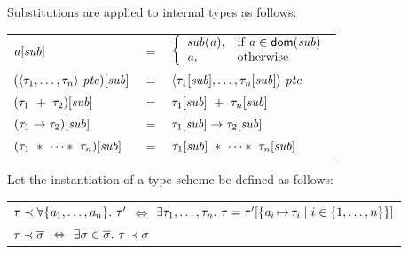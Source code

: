 \documentclass[final]{article}
\begin{document}
Substitutions are applied to internal types as follows:
\begin{center}
  \begin{tabular}{lll}
    $\mathit{a}[\mathit{sub}]$
    & $=$
    & $\left\{
    \begin{array}{ll}
      \mathit{sub}(\mathit{a}),
      &
      \mbox{if }\mathit{a}\in\mathsf{dom}(\mathit{sub})
      \\
      \mathit{a},
      &
      \mbox{otherwise}
    \end{array}
    \right.$
    \\

    $(\langle \mathit{\tau}_1,\dots,\mathit{\tau}_n \rangle\ \mathit{ptc})[\mathit{sub}]$
    & $=$
    & $\langle \mathit{\tau}_1[\mathit{sub}],\dots,\mathit{\tau}_n[\mathit{sub}] \rangle\ \mathit{ptc}$
    \\

    $(\mathit{\tau}_1\ +\ \mathit{\tau}_2)[\mathit{sub}]$
    & $=$
    & $\mathit{\tau}_1[\mathit{sub}]\ +\ \mathit{\tau}_n[\mathit{sub}]$
    \\

    $(\mathit{\tau}_1\rightarrow\mathit{\tau}_2)[\mathit{sub}]$
    & $=$
    & $\mathit{\tau}_1[\mathit{sub}]\rightarrow\mathit{\tau}_2[\mathit{sub}]$
    \\

    $(\mathit{\tau}_1\ *\ \cdots *\ \mathit{\tau}_n)[\mathit{sub}]$
    & $=$
    & $\mathit{\tau}_1[\mathit{sub}]\ *\ \cdots *\ \mathit{\tau}_n[\mathit{sub}]$
  \end{tabular}
\end{center}

Let the instantiation of a type scheme be defined as follows:
\begin{center}
  \begin{tabular}{l}
    $\mathit{\tau} \prec \forall\{\mathit{a}_1,\dots,\mathit{a}_n\}.\ \mathit{\tau}'$
    $\iff$
    $\exists\mathit{\tau}_1,\dots,\mathit{\tau}_n.\ \mathit{\tau}
      =\mathit{\tau}'[\{\mathit{a}_i\,{\mapsto}\,\mathit{\tau}_i\mid{i}\in\{1,\dots,n\}\}]
   $
    \\

    $\mathit{\tau} \prec \overline{\mathit{\sigma}}$
    $\iff$
    $\exists\mathit{\sigma}\in\overline{\mathit{\sigma}}.\ \mathit{\tau} \prec \mathit{\sigma}$
  \end{tabular}
\end{center}
\end{document}
